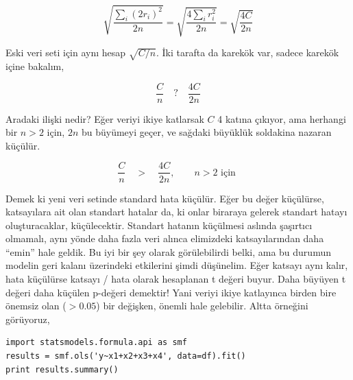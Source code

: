 \documentclass[12pt,fleqn]{article}\usepackage{../../common}
\begin{document}
$$ \sqrt{\frac{\sum_i (2r_i)^2}{2n}} =
\sqrt{\frac{4 \sum_i r_i^2}{2n}}  = 
\sqrt{\frac{4 C}{2n}}  
$$

Eski veri seti için aynı hesap $\sqrt{C/n}$. İki tarafta da karekök var, sadece
karekök içine bakalım,

$$  
\frac{C}{n} \quad ? \quad \frac{4 C}{2n}
$$

Aradaki ilişki nedir? Eğer veriyi ikiye katlarsak $C$ 4 katına çıkıyor, ama
herhangi bir $n > 2$ için, $2n$ bu büyümeyi geçer, ve sağdaki büyüklük soldakina
nazaran küçülür.

$$  
\frac{C}{n} \quad > \quad \frac{4 C}{2n}, \qquad n>2 \textrm{ için }
$$

Demek ki yeni veri setinde standard hata küçülür. Eğer bu değer küçülürse,
katsayılara ait olan standart hatalar da, ki onlar biraraya gelerek standart
hatayı oluşturacaklar, küçülecektir. Standart hatanın küçülmesi aslında
şaşırtıcı olmamalı, aynı yönde daha fazla veri alınca elimizdeki katsayılarından
daha ``emin'' hale geldik. Bu iyi bir şey olarak görülebilirdi belki, ama bu
durumun modelin geri kalanı üzerindeki etkilerini şimdi düşünelim. Eğer katsayı
aynı kalır, hata küçülürse katsayı / hata olarak hesaplanan t değeri buyur. Daha
büyüyen t değeri daha küçülen p-değeri demektir! Yani veriyi ikiye katlayınca
birden bire önemsiz olan ($>0.05$) bir değişken, önemli hale gelebilir. Altta
örneğini görüyoruz,

\begin{verbatim}
import statsmodels.formula.api as smf
results = smf.ols('y~x1+x2+x3+x4', data=df).fit()
print results.summary()
\end{verbatim}
\end{document}

